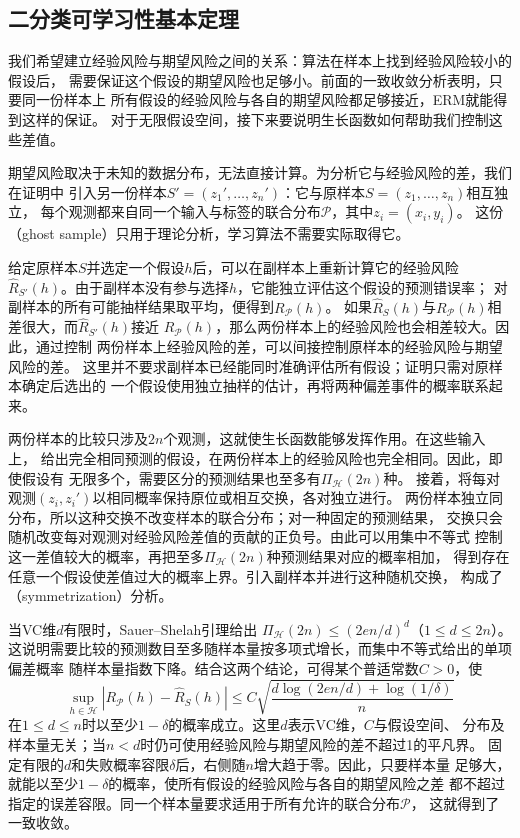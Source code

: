 \subsection{二分类可学习性基本定理}
\label{sec:binary-learnability-characterization}

我们希望建立经验风险与期望风险之间的关系：算法在样本上找到经验风险较小的假设后，
需要保证这个假设的期望风险也足够小。前面的一致收敛分析表明，只要同一份样本上
所有假设的经验风险与各自的期望风险都足够接近，ERM就能得到这样的保证。
对于无限假设空间，接下来要说明生长函数如何帮助我们控制这些差值。

期望风险取决于未知的数据分布，无法直接计算。为分析它与经验风险的差，我们在证明中
引入另一份样本$S'=(z_1',\ldots,z_n')$：它与原样本$S=(z_1,\ldots,z_n)$相互独立，
每个观测都来自同一个输入与标签的联合分布$\mathcal P$，其中$z_i=(x_i,y_i)$。
这份（ghost sample）只用于理论分析，学习算法不需要实际取得它。

给定原样本$S$并选定一个假设$h$后，可以在副样本上重新计算它的经验风险
$\hat R_{S'}(h)$。由于副样本没有参与选择$h$，它能独立评估这个假设的预测错误率；
对副样本的所有可能抽样结果取平均，便得到$R_{\mathcal P}(h)$。
如果$\hat R_S(h)$与$R_{\mathcal P}(h)$相差很大，而$\hat R_{S'}(h)$接近
$R_{\mathcal P}(h)$，那么两份样本上的经验风险也会相差较大。因此，通过控制
两份样本上经验风险的差，可以间接控制原样本的经验风险与期望风险的差。
这里并不要求副样本已经能同时准确评估所有假设；证明只需对原样本确定后选出的
一个假设使用独立抽样的估计，再将两种偏差事件的概率联系起来。

两份样本的比较只涉及$2n$个观测，这就使生长函数能够发挥作用。在这些输入上，
给出完全相同预测的假设，在两份样本上的经验风险也完全相同。因此，即使假设有
无限多个，需要区分的预测结果也至多有$\Pi_{\mathcal H}(2n)$种。
接着，将每对观测$(z_i,z_i')$以相同概率保持原位或相互交换，各对独立进行。
两份样本独立同分布，所以这种交换不改变样本的联合分布；对一种固定的预测结果，
交换只会随机改变每对观测对经验风险差值的贡献的正负号。由此可以用集中不等式
控制这一差值较大的概率，再把至多$\Pi_{\mathcal H}(2n)$种预测结果对应的概率相加，
得到存在任意一个假设使差值过大的概率上界。引入副样本并进行这种随机交换，
构成了（symmetrization）分析。

当VC维$d$有限时，Sauer--Shelah引理给出
$\Pi_{\mathcal H}(2n)\leq(2en/d)^d$（$1\leq d\leq 2n$）。
这说明需要比较的预测数目至多随样本量按多项式增长，而集中不等式给出的单项偏差概率
随样本量指数下降。结合这两个结论，可得某个普适常数$C>0$，使
\begin{equation}
 \sup_{h\in\mathcal H}|R_{\mathcal P}(h)-\hat R_S(h)|
 \leq C\sqrt{\frac{d\log(2en/d)+\log(1/\delta)}{n}}
 \label{eq:vc-uniform-bound}
\end{equation}
在$1\leq d\leq n$时以至少$1-\delta$的概率成立。这里$d$表示VC维，$C$与假设空间、
分布及样本量无关；当$n<d$时仍可使用经验风险与期望风险的差不超过1的平凡界。
固定有限的$d$和失败概率容限$\delta$后，右侧随$n$增大趋于零。因此，只要样本量
足够大，就能以至少$1-\delta$的概率，使所有假设的经验风险与各自的期望风险之差
都不超过指定的误差容限。同一个样本量要求适用于所有允许的联合分布$\mathcal P$，
这就得到了一致收敛。

